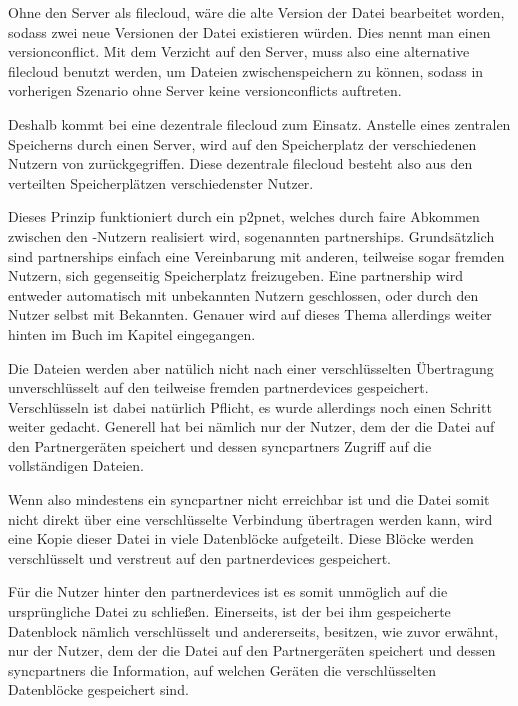 Ohne den Server als \gls{filecloud}, wäre die alte Version der Datei bearbeitet worden, sodass zwei
neue Versionen der Datei existieren würden. Dies nennt man einen \gls{versionconflict}.
Mit dem Verzicht auf den Server, muss also eine alternative \gls{filecloud} benutzt
werden, um Dateien zwischenspeichern zu können, sodass in vorherigen Szenario ohne Server
keine \glspl{versionconflict} auftreten.

Deshalb kommt bei \sblit eine dezentrale \gls{filecloud} zum Einsatz. Anstelle
eines zentralen Speicherns durch einen Server, wird auf den Speicherplatz der
verschiedenen Nutzern von \sblit zurückgegriffen. Diese dezentrale \gls{filecloud}
besteht also aus den verteilten Speicherplätzen verschiedenster Nutzer.

Dieses Prinzip funktioniert durch ein \gls{p2pnet}, welches durch faire Abkommen zwischen den \sblit-Nutzern realisiert wird,
sogenannten \glspl{partnership}. Grundsätzlich sind \glspl{partnership} einfach eine
Vereinbarung mit anderen, teilweise sogar fremden Nutzern, sich gegenseitig Speicherplatz
freizugeben. Eine \gls{partnership} wird entweder automatisch mit unbekannten Nutzern
geschlossen, oder durch den Nutzer selbst mit Bekannten. Genauer wird auf dieses Thema allerdings weiter hinten im Buch im
Kapitel  eingegangen.

Die Dateien werden aber natülich nicht nach einer verschlüsselten Übertragung unverschlüsselt
auf den teilweise fremden \glspl{partnerdevice} gespeichert. Verschlüsseln ist dabei
natürlich Pflicht, es wurde allerdings noch einen Schritt weiter gedacht. Generell
hat bei \sblit nämlich nur der Nutzer, dem der die Datei auf den Partnergeräten speichert und
dessen \glspl{syncpartner} Zugriff auf die vollständigen Dateien.

Wenn also mindestens ein \gls{syncpartner} nicht erreichbar ist und die Datei somit
nicht direkt über eine verschlüsselte Verbindung übertragen werden kann, wird eine Kopie
dieser Datei in viele Datenblöcke aufgeteilt. Diese Blöcke werden verschlüsselt und
verstreut auf den \glspl{partnerdevice} gespeichert.

Für die Nutzer hinter den \glspl{partnerdevice} ist es somit unmöglich auf die ursprüngliche
Datei zu schließen. Einerseits, ist der bei ihm gespeicherte Datenblock nämlich
verschlüsselt und andererseits, besitzen, wie zuvor erwähnt, nur der Nutzer, dem
der die Datei auf den Partnergeräten speichert und dessen \glspl{syncpartner}
die Information, auf welchen Geräten die verschlüsselten Datenblöcke gespeichert sind. %

